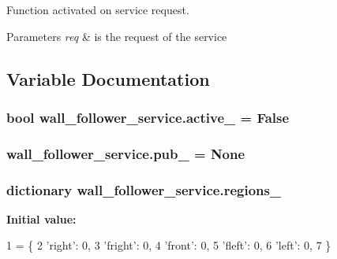 Function activated on service request. 


\begin{DoxyParams}{Parameters}
{\em req} & is the request of the service \\
\hline
\end{DoxyParams}


\subsection{Variable Documentation}
\subsubsection[{\texorpdfstring{active\+\_\+}{active_}}]{\setlength{\rightskip}{0pt plus 5cm}bool wall\+\_\+follower\+\_\+service.\+active\+\_\+ = False}\hypertarget{namespacewall__follower__service_acb03ef4ad62b64de43b4a4275d615e74}{}\label{namespacewall__follower__service_acb03ef4ad62b64de43b4a4275d615e74}
\subsubsection[{\texorpdfstring{pub\+\_\+}{pub_}}]{\setlength{\rightskip}{0pt plus 5cm}wall\+\_\+follower\+\_\+service.\+pub\+\_\+ = None}\hypertarget{namespacewall__follower__service_a2dba1ae8fd1b1af992b7872d2a7405f0}{}\label{namespacewall__follower__service_a2dba1ae8fd1b1af992b7872d2a7405f0}
\subsubsection[{\texorpdfstring{regions\+\_\+}{regions_}}]{\setlength{\rightskip}{0pt plus 5cm}dictionary wall\+\_\+follower\+\_\+service.\+regions\+\_\+}\hypertarget{namespacewall__follower__service_a5becd7ef6745adb020e646fde0af14f4}{}\label{namespacewall__follower__service_a5becd7ef6745adb020e646fde0af14f4}
{\bfseries Initial value\+:}
\begin{DoxyCode}
1 = \{
2     \textcolor{stringliteral}{'right'}: 0,
3     \textcolor{stringliteral}{'fright'}: 0,
4     \textcolor{stringliteral}{'front'}: 0,
5     \textcolor{stringliteral}{'fleft'}: 0,
6     \textcolor{stringliteral}{'left'}: 0,
7 \}
\end{DoxyCode}
